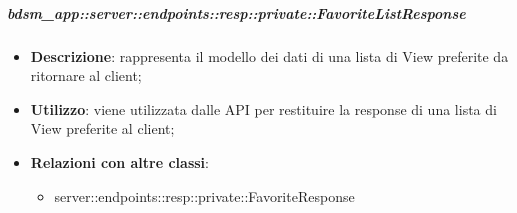     \subparagraph{bdsm\_app::server::endpoints::resp::private::FavoriteListResponse} %
    \label{subp:bdsm_app_server_endpoints_resp_private_favoritelistresponse}
    \begin{itemize}
      \item \textbf{Descrizione}: rappresenta il modello dei dati di una lista di View preferite da ritornare al client;
      \item \textbf{Utilizzo}: viene utilizzata dalle API per restituire la response di una lista di View preferite al client;
      \item \textbf{Relazioni con altre classi}:
        \begin{itemize}
          \item server::endpoints::resp::private::FavoriteResponse
        \end{itemize}
      \end{itemize}
